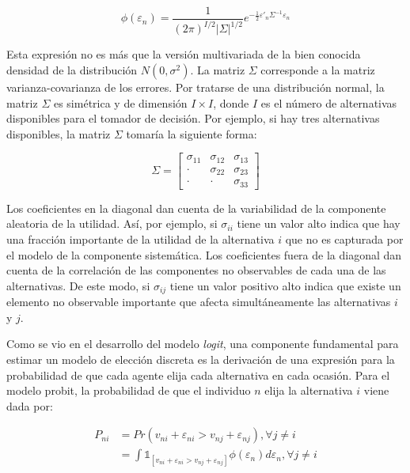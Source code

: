 \documentclass[
]{book}
\begin{document}
\begin{equation} 
  \phi(\varepsilon_n) = \frac{1}{(2\pi)^{I/2}|\Sigma|^{1/2}}e^{-\frac{1}{2} \varepsilon'_n \Sigma^{-1}\varepsilon_n} 
  \label{eq:density}
\end{equation}

Esta expresión no es más que la versión multivariada de la bien conocida densidad de la distribución \(N(0, \sigma^2)\). La matriz \(\Sigma\) corresponde a la matriz varianza-covarianza de los errores. Por tratarse de una distribución normal, la matriz \(\Sigma\) es simétrica y de dimensión \(I \times I\), donde \(I\) es el número de alternativas disponibles para el tomador de decisión. Por ejemplo, si hay tres alternativas disponibles, la matriz \(\Sigma\) tomaría la siguiente forma:

\begin{equation} 
  \Sigma = \begin{bmatrix} \sigma_{11} & \sigma_{12} & \sigma_{13}\\
 \cdot & \sigma_{22} & \sigma_{23}\\
 \cdot & \cdot & \sigma_{33}
\end{bmatrix} 
  \label{eq:matrix}
\end{equation}

Los coeficientes en la diagonal dan cuenta de la variabilidad de la componente aleatoria de la utilidad. Así, por ejemplo, si \(\sigma_{ii}\) tiene un valor alto indica que hay una fracción importante de la utilidad de la alternativa \(i\) que no es capturada por el modelo de la componente sistemática. Los coeficientes fuera de la diagonal dan cuenta de la correlación de las componentes no observables de cada una de las alternativas. De este modo, si \(\sigma_{ij}\) tiene un valor positivo alto indica que existe un elemento no observable importante que afecta simultáneamente las alternativas \(i\) y \(j\).

Como se vio en el desarrollo del modelo \emph{logit}, una componente fundamental para estimar un modelo de elección discreta es la derivación de una expresión para la probabilidad de que cada agente elija cada alternativa en cada ocasión. Para el modelo probit, la probabilidad de que el individuo \(n\) elija la alternativa \(i\) viene dada por:

\begin{equation} 
  \begin{aligned}
    P_{ni} &= Pr (v_{ni} + \varepsilon_{ni} > v_{nj} + \varepsilon_{nj}), \forall j \neq i \\
    &= \int \mathbb{1}_{[v_{ni} + \varepsilon_{ni} > v_{nj} + \varepsilon_{nj}]}\phi(\varepsilon_n)d\varepsilon_n, \forall j \neq i
  \end{aligned}  
  \label{eq:modprobit}
\end{equation}
\end{document}
